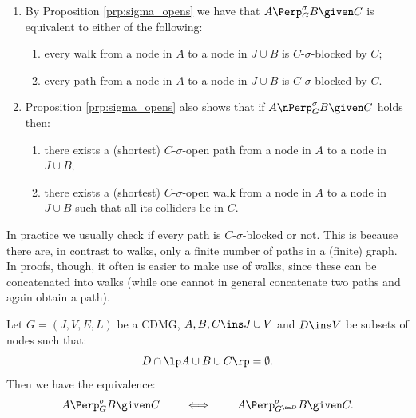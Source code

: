 \begin{Rem}
    \begin{enumerate}
        \item By Proposition \ref{prp:sigma_opens} we have that $A \Perp^\sigma_G B \given C$ is equivalent to either of the following:
  \begin{enumerate}
      \item every walk from a node in $A$ to a node in $J \cup B$ is $C$-$\sigma$-blocked by $C$;
      \item every path from a node in $A$ to a node in $J \cup B$ is $C$-$\sigma$-blocked by $C$.
  \end{enumerate}
    \item Proposition \ref{prp:sigma_opens} also shows that if $A \nPerp^\sigma_G B \given C$ holds then:
  \begin{enumerate}
      \item there exists a (shortest) $C$-$\sigma$-open path from a node in $A$ to a node in $J \cup B$;
      \item there exists a (shortest) $C$-$\sigma$-open walk from a node in $A$ to a node in $J \cup B$ such that all its colliders lie in $C$.
  \end{enumerate}
  \end{enumerate}
  In practice we usually check if every path is $C$-$\sigma$-blocked or not. This is because there are, in contrast to walks, only a finite number of paths in a (finite) graph. In proofs, though, it often is easier to make use of walks, since these can be concatenated into walks (while one cannot in general concatenate two paths and again obtain a path).
\end{Rem}

\begin{Lem}\label{lem:stability_separation_marginalization}
        Let $G=(J,V,E,L)$ be a CDMG, $A,B,C \ins J \cup V$ and $D \ins V$ 
        be subsets of nodes such that:
        \[ D \cap \lp A \cup B \cup C\rp = \emptyset.\]
        Then we have the equivalence:
        \[ A \Perp^\sigma_G B \given C \qquad \iff \qquad  A \Perp^\sigma_{G^{\sm D} }B \given C. \]
\end{Lem}

